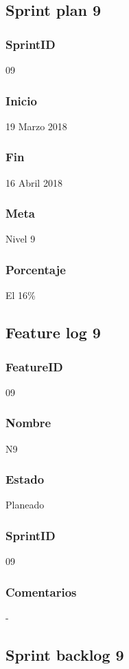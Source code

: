

\subsection{Sprint plan 9}
\subsubsection{SprintID}
09
\subsubsection{Inicio}
19 Marzo 2018

\subsubsection{Fin}
16 Abril 2018
\subsubsection{Meta}
Nivel 9
\subsubsection{Porcentaje}
El 16\% 


\subsection{Feature log 9}

\subsubsection{FeatureID}
09
\subsubsection{Nombre}
N9
\subsubsection{Estado}
Planeado

\subsubsection{SprintID}
09
\subsubsection{Comentarios}
-


\subsection{Sprint backlog 9}
